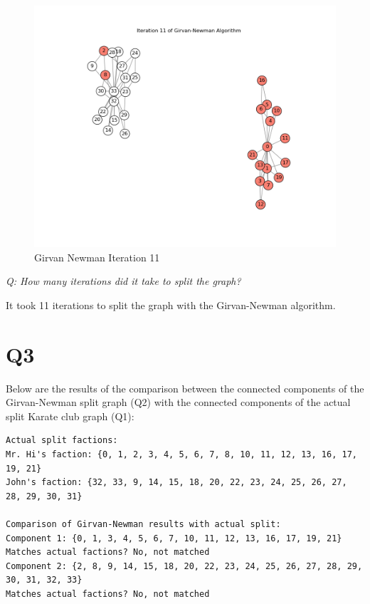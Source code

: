 \documentclass[12pt]{article}
\begin{document}
\begin{figure}
    \centering
    \includegraphics[width=1\linewidth]{iterations/girvan_newman_iteration_11.png}
    \caption{Girvan Newman Iteration 11}
    \label{fig:iteration_11}
\end{figure}

\emph{Q: How many iterations did it take to split the graph?}

It took 11 iterations to split the graph with the Girvan-Newman algorithm.


\section*{Q3}

Below are the results of the comparison between the connected components of the Girvan-Newman split graph (Q2) with the connected components of the actual split Karate club graph (Q1):

\begin{lstlisting}
Actual split factions:
Mr. Hi's faction: {0, 1, 2, 3, 4, 5, 6, 7, 8, 10, 11, 12, 13, 16, 17, 19, 21}
John's faction: {32, 33, 9, 14, 15, 18, 20, 22, 23, 24, 25, 26, 27, 28, 29, 30, 31}

Comparison of Girvan-Newman results with actual split:
Component 1: {0, 1, 3, 4, 5, 6, 7, 10, 11, 12, 13, 16, 17, 19, 21}
Matches actual factions? No, not matched
Component 2: {2, 8, 9, 14, 15, 18, 20, 22, 23, 24, 25, 26, 27, 28, 29, 30, 31, 32, 33}
Matches actual factions? No, not matched
\end{lstlisting}
\end{document}
